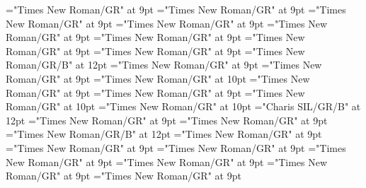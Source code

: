 \documentclass[gps1,twoside]{article}
\begin{document}
\font\spanspannameslotslotsmorphosyntaxanalysismorphosyntaxanalysescomplexformsnotsubentrycomplexformsnotsubentriesentrybefore="Times New Roman/GR" at 9pt
\font\spannameslotslotsmorphosyntaxanalysismorphosyntaxanalysescomplexformsnotsubentrycomplexformsnotsubentriesentrylastchildafter="Times New Roman/GR" at 9pt
\font\spanspanowningentrysummarydefinitioncomplexformsnotsubentrycomplexformsnotsubentriesentrybefore="Times New Roman/GR" at 9pt
\font\spanowningentrysummarydefinitioncomplexformsnotsubentrycomplexformsnotsubentriesentryfirstchildbefore="Times New Roman/GR" at 9pt
\font\spanowningentrysummarydefinitioncomplexformsnotsubentrycomplexformsnotsubentriesentrylastchildafter="Times New Roman/GR" at 9pt
\font\nontrivialentryrootnontrivialentryrootnontrivialentryrootscomplexformsnotsubentrycomplexformsnotsubentriesentrybefore="Times New Roman/GR" at 9pt
\font\nontrivialentryrootscomplexformsnotsubentrycomplexformsnotsubentriesentrybefore="Times New Roman/GR" at 9pt
\font\nontrivialentryrootscomplexformsnotsubentrycomplexformsnotsubentriesentryafter="Times New Roman/GR" at 9pt
\font\nontrivialentryrootnontrivialentryrootscomplexformsnotsubentrycomplexformsnotsubentriesentry="Times New Roman/GR/B" at 12pt
\font\spanspanpicturesentrybefore="Times New Roman/GR" at 9pt
\font\picturesentryafter="Times New Roman/GR" at 9pt
\font\picturepicturesentry="Times New Roman/GR" at 10pt
\font\picturepicturesentryafter="Times New Roman/GR" at 9pt
\font\spanspancaptionpicturepicturesentrybefore="Times New Roman/GR" at 9pt
\font\paracontinuationsubentriesentry="Times New Roman/GR" at 10pt
\font\subentrysubentriesentry="Times New Roman/GR" at 10pt
\font\spanbzhheadwordsubentrysubentriesentry="Charis SIL/GR/B" at 12pt
\font\spanspanheadwordsubentrysubentriesentrybefore="Times New Roman/GR" at 9pt
\font\spanheadwordsubentrysubentriesentrylastchildafter="Times New Roman/GR" at 9pt
\font\spanheadwordsubentrysubentriesentry="Times New Roman/GR/B" at 12pt
\font\complexformtypessubentrysubentriesentryafter="Times New Roman/GR" at 9pt
\font\spanspanreverseabbrcomplexformtypecomplexformtypessubentrysubentriesentrybefore="Times New Roman/GR" at 9pt
\font\pronunciationpronunciationpronunciationssubentrysubentriesentrybefore="Times New Roman/GR" at 9pt
\font\pronunciationssubentrysubentriesentryafter="Times New Roman/GR" at 9pt
\font\spanspanformpronunciationpronunciationssubentrysubentriesentrybefore="Times New Roman/GR" at 9pt
\font\spanformpronunciationpronunciationssubentrysubentriesentryfirstchildbefore="Times New Roman/GR" at 9pt
\font\spanformpronunciationpronunciationssubentrysubentriesentrylastchildafter="Times New Roman/GR" at 9pt
\end{document}
